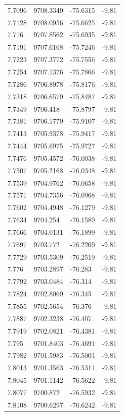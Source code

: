\begin{table}[H]
\begin{tabular}{llll}
7.7096 & 9708.3349 & -75.6315 & -9.81 \\
7.7128 & 9708.0956 & -75.6625 & -9.81 \\
7.716 & 9707.8562 & -75.6935 & -9.81 \\
7.7191 & 9707.6168 & -75.7246 & -9.81 \\
7.7223 & 9707.3772 & -75.7556 & -9.81 \\
7.7254 & 9707.1376 & -75.7866 & -9.81 \\
7.7286 & 9706.8978 & -75.8176 & -9.81 \\
7.7318 & 9706.6579 & -75.8487 & -9.81 \\
7.7349 & 9706.418 & -75.8797 & -9.81 \\
7.7381 & 9706.1779 & -75.9107 & -9.81 \\
7.7413 & 9705.9378 & -75.9417 & -9.81 \\
7.7444 & 9705.6975 & -75.9727 & -9.81 \\
7.7476 & 9705.4572 & -76.0038 & -9.81 \\
7.7507 & 9705.2168 & -76.0348 & -9.81 \\
7.7539 & 9704.9762 & -76.0658 & -9.81 \\
7.7571 & 9704.7356 & -76.0968 & -9.81 \\
7.7602 & 9704.4948 & -76.1279 & -9.81 \\
7.7634 & 9704.254 & -76.1589 & -9.81 \\
7.7666 & 9704.0131 & -76.1899 & -9.81 \\
7.7697 & 9703.772 & -76.2209 & -9.81 \\
7.7729 & 9703.5309 & -76.2519 & -9.81 \\
7.776 & 9703.2897 & -76.283 & -9.81 \\
7.7792 & 9703.0484 & -76.314 & -9.81 \\
7.7824 & 9702.8069 & -76.345 & -9.81 \\
7.7855 & 9702.5654 & -76.376 & -9.81 \\
7.7887 & 9702.3238 & -76.407 & -9.81 \\
7.7919 & 9702.0821 & -76.4381 & -9.81 \\
7.795 & 9701.8403 & -76.4691 & -9.81 \\
7.7982 & 9701.5983 & -76.5001 & -9.81 \\
7.8013 & 9701.3563 & -76.5311 & -9.81 \\
7.8045 & 9701.1142 & -76.5622 & -9.81 \\
7.8077 & 9700.872 & -76.5932 & -9.81 \\
7.8108 & 9700.6297 & -76.6242 & -9.81 \\

\end{tabular}
\end{table}
